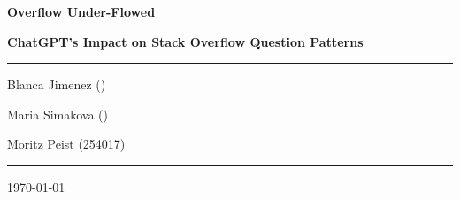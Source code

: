 \documentclass[12pt]{article}
\begin{document}
\begin{titlepage}
	\centering
	\par\vspace{0.75cm}
	{\huge\bfseries Overflow Under-Flowed\par}
    {\large\bfseries ChatGPT's Impact on Stack Overflow Question Patterns \par}
	\vspace{0.25cm}
    \noindent\rule{\textwidth}{1pt}
    {\Large Blanca Jimenez ()\par}
    {\Large Maria Simakova ()\par}
	{\Large Moritz Peist (254017)\par}
    \noindent\rule{\textwidth}{1pt}
    \tableofcontents
	\vfill

	{\large \today\par}
\end{titlepage}

\newpage




%

\printbibliography[heading=bibintoc,title={References}]
\end{document}
